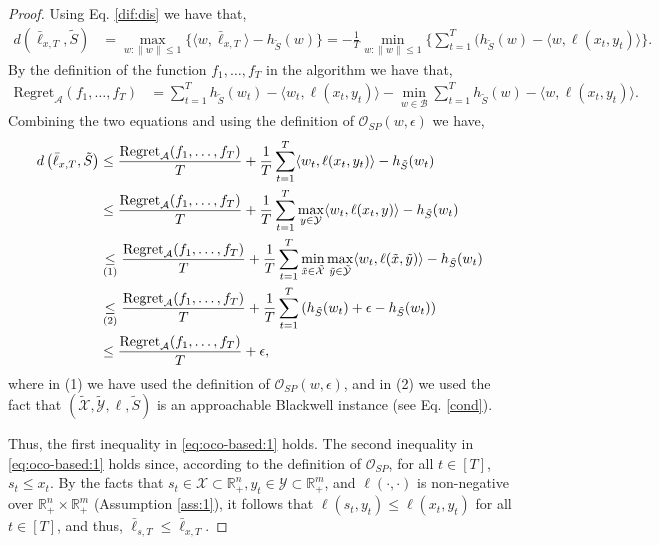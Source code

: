 \documentclass[a4paper,12pt]{article}
\newcommand{\mY}{\mathcal{Y}}
\newcommand{\mX}{\mathcal{X}}
\newcommand{\tY}{\tilde{\mathcal{Y}}}
\newcommand{\tX}{\tilde{\mathcal{X}}}
\newcommand{\tS}{\tilde{S}}
\newcommand{\mA}{\mathcal{A}}
\newcommand{\mB}{\mathcal{B}}
\newcommand{\reals}{\mathbb{R}}
\newcommand{\oraclesp}{\mathcal{O}_{SP}}
\begin{document}
\begin{proof}
Using  Eq. \eqref{dif:dis} we have that,
\begin{align*}
d\left(\bar{\ell}_{x,T} , \tS \right) &=\max_{w: \|w\|\leq 1}\{\langle w , \bar{\ell}_{x,T} \rangle - h_{\tS}(w)\} = -\frac{1}{T}\min_{w: \|w\|\leq 1}\{\sum_{t=1}^T (h_{\tS}(w)-\langle w ,\ell  (x_t,y_t) \rangle\}.
\end{align*}
By the definition of the function $f_1,\dots,f_T$ in the algorithm we have that,
\begin{align*}
\text{Regret}_{\mA}(f_1,\dots,f_T)&=\sum_{t=1}^T  h_{\tS}(w_t)-\langle w_t , \ell(x_t,y_t)\rangle-\min_{w\in \mB}\sum_{t=1}^T  h_{\tS}(w)-\langle w , \ell (x_t,y_t)\rangle.
\end{align*}
Combining the two equations and using the definition of $\oraclesp(w,\epsilon)$ we have,
\begin{align}
\label{result1 oco-based app  alg}
d\left(\bar{\ell}_{x,T} , \tS \right) &\leq \frac{\text{Regret}_{\mA}(f_1,\dots,f_T)}{T}+\frac{1}{T}\sum_{t=1}^T \langle w_t , \ell (x_t,y_t)\rangle - h_{\tS}(w_t) \notag \\ 
&\leq \frac{\text{Regret}_{\mA}(f_1,\dots,f_T)}{T}+\frac{1}{T}\sum_{t=1}^T \max_{y\in \mY}\langle w_t , \ell (x_t,y)\rangle - h_{\tS}(w_t) \notag \\ 
&\underset{(1)}{\leq} \frac{\text{Regret}_{\mA}(f_1,\dots,f_T)}{T}+\frac{1}{T}\sum_{t=1}^T \min_{\tilde{x}\in\tX}\max_{\tilde{y}\in \tY}\langle w_t , \ell (\tilde{x},\tilde{y})\rangle - h_{\tS}(w_t) \notag \\ 
&\underset{(2)}{\leq} \frac{\text{Regret}_{\mA}(f_1,\dots,f_T)}{T}+\frac{1}{T}\sum_{t=1}^T \left( h_{\tS}(w_t)+\epsilon- h_{\tS}(w_t) \right) \notag \\
&\leq \frac{\text{Regret}_{\mA}(f_1,\dots,f_T)}{T}+\epsilon ,
\end{align}
where in (1) we have used the definition of $\oraclesp(w,\epsilon)$, and in (2) we used the fact that $(\tX,\tY,\ell ,\tS)$ is an approachable Blackwell instance (see Eq. \eqref{cond}). 

Thus, the first inequality in \eqref{eq:oco-based:1} holds. The second inequality in \eqref{eq:oco-based:1} holds since, according to the definition of $\oraclesp$, for all $t\in[T]$, $s_t \leq x_t$. By the facts that $s_t\in\mX\subset\reals^n_+, y_t\in\mY\subset\reals^m_+$, and $\ell(\cdot ,\cdot)$ is non-negative over $\reals^n_+\times\reals^m_+$ (Assumption \ref{ass:1}), it follows that  $\ell(s_t,y_t) \leq \ell (x_t,y_t)$ for all $t\in[T]$, and thus, $\bar{\ell}_{s,T} \leq \bar{\ell}_{x,T}$.


\end{proof}
\end{document}
